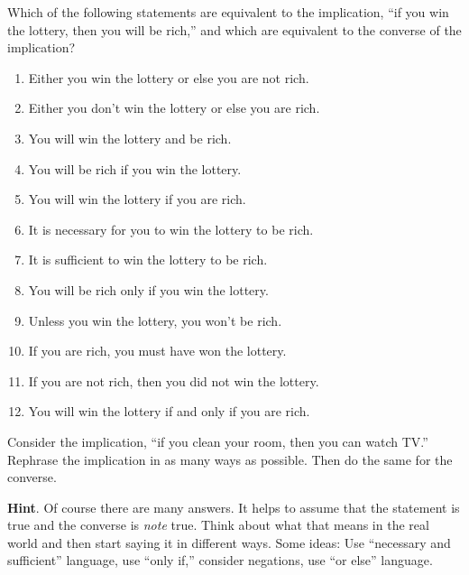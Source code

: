\documentclass[10pt,]{book}
\theoremstyle{plain}
\theoremstyle{definition}
\theoremstyle{definition}
\theoremstyle{definition}
\theoremstyle{definition}
\numberwithin{equation}{chapter}
\begin{document}
\begin{divisionexercise}{5}\hypertarget{exercise-181}{}
\hypertarget{p-1387}{}%
Which of the following statements are equivalent to the implication, ``if you win the lottery, then you will be rich,'' and which are equivalent to the converse of the implication?%
\leavevmode%
\begin{enumerate}[label=(\alph*)]
\item\hypertarget{li-357}{}\hypertarget{p-1388}{}%
Either you win the lottery or else you are not rich.%
\item\hypertarget{li-358}{}\hypertarget{p-1389}{}%
Either you don't win the lottery or else you are rich.%
\item\hypertarget{li-359}{}\hypertarget{p-1390}{}%
You will win the lottery and be rich.%
\item\hypertarget{li-360}{}\hypertarget{p-1391}{}%
You will be rich if you win the lottery.%
\item\hypertarget{li-361}{}\hypertarget{p-1392}{}%
You will win the lottery if you are rich.%
\item\hypertarget{li-362}{}\hypertarget{p-1393}{}%
It is necessary for you to win the lottery to be rich.%
\item\hypertarget{li-363}{}\hypertarget{p-1394}{}%
It is sufficient to win the lottery to be rich.%
\item\hypertarget{li-364}{}\hypertarget{p-1395}{}%
You will be rich only if you win the lottery.%
\item\hypertarget{li-365}{}\hypertarget{p-1396}{}%
Unless you win the lottery, you won't be rich.%
\item\hypertarget{li-366}{}\hypertarget{p-1397}{}%
If you are rich, you must have won the lottery.%
\item\hypertarget{li-367}{}\hypertarget{p-1398}{}%
If you are not rich, then you did not win the lottery.%
\item\hypertarget{li-368}{}\hypertarget{p-1399}{}%
You will win the lottery if and only if you are rich.%
\end{enumerate}
\end{divisionexercise}%
\begin{divisionexercise}{6}\hypertarget{exercise-182}{}
\hypertarget{p-1413}{}%
Consider the implication, ``if you clean your room, then you can watch TV.'' Rephrase the implication in as many ways as possible. Then do the same for the converse.%
\par\smallskip%
\noindent\textbf{Hint}.\hypertarget{hint-68}{}\quad%
\hypertarget{p-1414}{}%
Of course there are many answers. It helps to assume that the statement is true and the converse is \emph{note} true. Think about what that means in the real world and then start saying it in different ways. Some ideas: Use ``necessary and sufficient'' language, use ``only if,'' consider negations, use ``or else'' language.%
\end{divisionexercise}%
\end{document}
